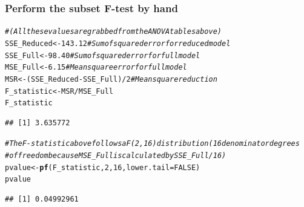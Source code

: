 \documentclass{article}\usepackage[]{graphicx}\usepackage[]{color}
\makeatletter
\newcommand{\hlnum}[1]{\textcolor[rgb]{0.686,0.059,0.569}{#1}}%
\newcommand{\hlcom}[1]{\textcolor[rgb]{0.678,0.584,0.686}{\textit{#1}}}%
\newcommand{\hlopt}[1]{\textcolor[rgb]{0,0,0}{#1}}%
\newcommand{\hlstd}[1]{\textcolor[rgb]{0.345,0.345,0.345}{#1}}%
\newcommand{\hlkwb}[1]{\textcolor[rgb]{0.69,0.353,0.396}{#1}}%
\newcommand{\hlkwc}[1]{\textcolor[rgb]{0.333,0.667,0.333}{#1}}%
\newcommand{\hlkwd}[1]{\textcolor[rgb]{0.737,0.353,0.396}{\textbf{#1}}}%
\newenvironment{kframe}{%
 \def\at@end@of@kframe{}%
 \ifinner\ifhmode%
  \def\at@end@of@kframe{\end{minipage}}%
  \begin{minipage}{\columnwidth}%
 \fi\fi%
 \def\FrameCommand##1{\hskip\@totalleftmargin \hskip-\fboxsep
 \colorbox{shadecolor}{##1}\hskip-\fboxsep
     \hskip-\linewidth \hskip-\@totalleftmargin \hskip\columnwidth}%
 \MakeFramed {\advance\hsize-\width
   \@totalleftmargin\z@ \linewidth\hsize
   \@setminipage}}%
 {\par\unskip\endMakeFramed%
 \at@end@of@kframe}
\newenvironment{knitrout}{}{} %
\makeatother
\begin{document}
\subsubsection*{Perform the subset F-test by hand}
\begin{knitrout}
\color{fgcolor}\begin{kframe}
\begin{alltt}
\hlcom{# (All these values are grabbed from the ANOVA tables above)}
\hlstd{SSE_Reduced} \hlkwb{<-} \hlnum{143.12}               \hlcom{# Sum of squared error for reduced model}
\hlstd{SSE_Full} \hlkwb{<-} \hlnum{98.40}                   \hlcom{# Sum of squared error for full model}
\hlstd{MSE_Full} \hlkwb{<-} \hlnum{6.15}                    \hlcom{# Mean square error for full model}
\hlstd{MSR} \hlkwb{<-} \hlstd{(SSE_Reduced} \hlopt{-} \hlstd{SSE_Full)} \hlopt{/} \hlnum{2} \hlcom{# Mean square reduction}
\hlstd{F_statistic} \hlkwb{<-} \hlstd{MSR} \hlopt{/} \hlstd{MSE_Full}
\hlstd{F_statistic}
\end{alltt}
\begin{verbatim}
## [1] 3.635772
\end{verbatim}
\begin{alltt}
\hlcom{# The F-statistic above follows a F(2,16) distribution (16 denominator degrees}
\hlcom{# of freedom because MSE_Full is calculated by SSE_Full / 16)}
\hlstd{pvalue} \hlkwb{<-} \hlkwd{pf}\hlstd{(F_statistic,} \hlnum{2}\hlstd{,} \hlnum{16}\hlstd{,} \hlkwc{lower.tail} \hlstd{=} \hlnum{FALSE}\hlstd{)}
\hlstd{pvalue}
\end{alltt}
\begin{verbatim}
## [1] 0.04992961
\end{verbatim}
\end{kframe}
\end{knitrout}
\end{document}
